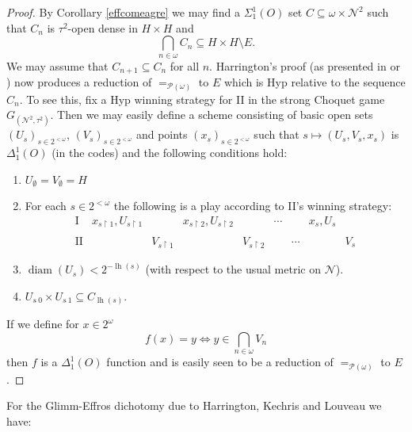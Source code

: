 \documentclass[11pt, english]{article}
\DeclareMathOperator{\lh}{lh} \DeclareMathOperator{\inn}{Inn}
\DeclareMathOperator{\diam}{diam}
\newcommand{\restrict}{\upharpoonright}
\newcommand{\baire}{\mathscr N}
\begin{document}
\begin{proof}

By Corollary \ref{effcomeagre} we may find a $\Sigma^1_1(O)$ set
$C\subseteq \omega\times\baire^2$ such that $C_n$ is $\tau^2$-open
dense in $H\times H$ and
$$
\bigcap_{n\in\omega} C_n\subseteq H\times H\setminus E.
$$
We may assume that $C_{n+1}\subseteq C_n$ for all $n$.
Harrington's proof (as presented in \cite{gao09} or \cite{jech03})
now produces a reduction of $=_{\mathcal{P}(\omega)}$ to $E$ which is
Hyp relative to the sequence $C_n$. To see this, fix a
Hyp winning strategy for II in the strong Choquet game
$G_{(\baire^2,\tau^2)}$. Then we may easily define a scheme
consisting of basic open sets $(U_s)_{s\in 2^{<\omega}}$,
$(V_s)_{s\in 2^{<\omega}}$ and points $(x_s)_{s\in 2^{<\omega}}$
such that $s\mapsto (U_s,V_s,x_s)$ is $\Delta_1^1(O)$ (in the codes) and the
following conditions hold:
\begin{enumerate}[(1)]
\item $U_\emptyset=V_\emptyset=H$ \item For each $s\in
2^{<\omega}$ the following is a play according to II's winning
strategy:
$$
\begin{array}{rlllllllll}
\mathrm{I}  & x_{s\restrict 1}, U_{s\restrict 1} &                  & x_{s\restrict 2}, U_{s\restrict 2}  &                  & \cdots  &        & x_s,U_s\\
   &                                   &                  &                                     &                  &         &        &         &  \\
\mathrm{II} &                                   & V_{s\restrict 1}
&                                     & V_{s\restrict 2} &
& \cdots &         & V_s
\end{array}
$$
\item $\diam(U_s)<2^{-\lh(s)}$ (with respect to the usual metric
on $\baire$). \item $U_{s\hat{\ }0}\times U_{s\hat{\ }1}\subseteq
C_{\lh(s)}$.
\end{enumerate}
If we define for $x\in 2^\omega$
$$
f(x)=y\iff y\in\bigcap_{n\in\omega} V_n
$$
then $f$ is a $\Delta^1_1(O)$ function and is easily seen to be a
reduction of $=_{\mathcal{P}(\omega)}$ to $E$.
\end{proof}

For the Glimm-Effros dichotomy
due to Harrington, Kechris and Louveau we have:
\end{document}

